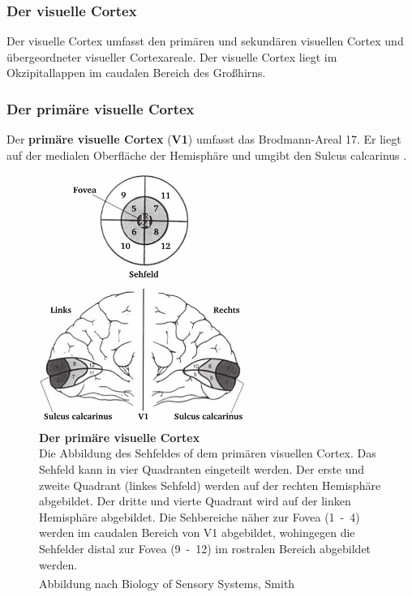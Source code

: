\documentclass[12pt,a4paper,pdftex]{article}
\begin{document}
\subsubsection*{Der visuelle Cortex}

Der visuelle Cortex umfasst den primären und sekundären visuellen Cortex und übergeordneter visueller Cortexareale. Der visuelle Cortex liegt im Okzipitallappen im caudalen Bereich des Großhirns. 


\subsubsection*{Der primäre visuelle Cortex}

Der \textbf{primäre visuelle Cortex} (\textbf{V1})  umfasst das Brodmann-Areal 17. Er liegt auf der medialen Oberfläche der Hemisphäre und umgibt den Sulcus calcarinus .


\begin{figure}[H]
    \centering
    \includegraphics[width = 0.6\textwidth]{pictures/visual/V1.png}
    \caption[Der primäre visuelle Cortex]{\textbf{Der primäre visuelle Cortex}\\
    Die Abbildung des Sehfeldes of dem primären visuellen Cortex. Das Sehfeld kann in vier Quadranten eingeteilt werden. Der erste und zweite Quadrant (linkes Sehfeld) werden auf der rechten Hemisphäre abgebildet. Der dritte und vierte Quadrant wird auf der linken Hemisphäre abgebildet. Die Sehbereiche näher zur Fovea (1~-~4) werden im caudalen Bereich von V1 abgebildet, wohingegen die Sehfelder distal zur Fovea (9~-~12) im rostralen Bereich abgebildet werden.\\
    Abbildung nach Biology of Sensory Systems, Smith \textsuperscript{\cite[18]{smith2008biology}}}
    \label{fig:my_label}
\end{figure}
\end{document}
